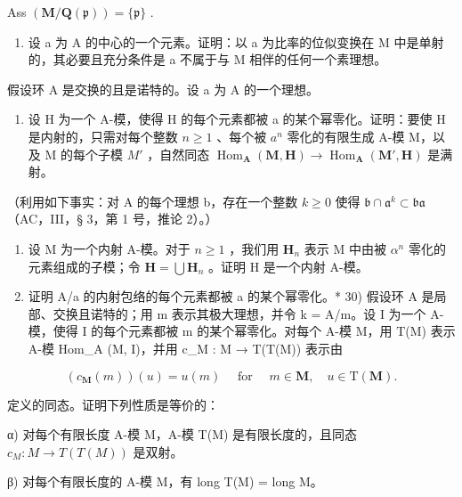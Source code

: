 Ass \((\mathbf{M} / \mathbf{Q}(\mathfrak{p})) = \{\mathfrak{p}\}\) .

\begin{enumerate}
\def\labelenumi{\alph{enumi})}
\setcounter{enumi}{4}
\tightlist
\item
  设 a 为 A 的中心的一个元素。证明：以 a 为比率的位似变换在 M 中是单射的，其必要且充分条件是 a 不属于与 M 相伴的任何一个素理想。
\end{enumerate}

假设环 A 是交换的且是诺特的。设 a 为 A 的一个理想。

\begin{enumerate}
\def\labelenumi{\alph{enumi})}
\tightlist
\item
  设 H 为一个 A-模，使得 H 的每个元素都被 a 的某个幂零化。证明：要使 H 是内射的，只需对每个整数 \(n \geqslant 1\) 、每个被 \(a^{n}\) 零化的有限生成 A-模 M，以及 M 的每个子模 \(M'\) ，自然同态 \(\operatorname{Hom}_{\mathbf{A}}(\mathbf{M}, \mathbf{H}) \to \operatorname{Hom}_{\mathbf{A}}(\mathbf{M}', \mathbf{H})\) 是满射。
\end{enumerate}

（利用如下事实：对 A 的每个理想 b，存在一个整数 \(k \geqslant 0\) 使得 \(\mathfrak{b} \cap \mathfrak{a}^k \subset \mathfrak{ba}\) （AC，III，§ 3，第 1 号，推论 2）。）

\begin{enumerate}
\def\labelenumi{\alph{enumi})}
\setcounter{enumi}{1}
\item
  设 M 为一个内射 A-模。对于 \(n \geqslant 1\) ，我们用 \(\mathbf{H}_{n}\) 表示 M 中由被 \(\alpha^{n}\) 零化的元素组成的子模；令 \(\mathbf{H} = \bigcup \mathbf{H}_{n}\) 。证明 H 是一个内射 A-模。
\item
  证明 A/a 的内射包络的每个元素都被 a 的某个幂零化。* 30) 假设环 A 是局部、交换且诺特的；用 m 表示其极大理想，并令 k = A/m。设 I 为一个 A-模，使得 I 的每个元素都被 m 的某个幂零化。对每个 A-模 M，用 T(M) 表示 A-模 Hom\_A (M, I)，并用 c\_M : M → T(T(M)) 表示由
\end{enumerate}

\[
\left(c _ {\mathbf {M}} (m)\right) (u) = u (m) \quad \text { for } \quad m \in \mathbf {M}  , \quad u \in \mathrm{T} (\mathbf {M})  .
\]

定义的同态。证明下列性质是等价的：

α) 对每个有限长度 A-模 M，A-模 T(M) 是有限长度的，且同态 \(c_{M}: M \to T(T(M))\) 是双射。

β) 对每个有限长度的 A-模 M，有 long T(M) = long M。

